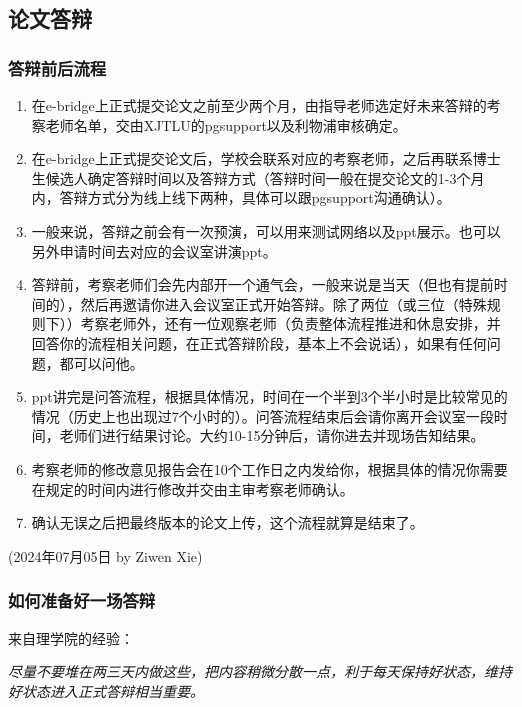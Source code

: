 \subsection{论文答辩}

\subsubsection{答辩前后流程}

\begin{enumerate}
    \item 在e-bridge上正式提交论文之前至少两个月，由指导老师选定好未来答辩的考察老师名单，交由XJTLU的pgsupport以及利物浦审核确定。
    \item 在e-bridge上正式提交论文后，学校会联系对应的考察老师，之后再联系博士生候选人确定答辩时间以及答辩方式（答辩时间一般在提交论文的1-3个月内，答辩方式分为线上线下两种，具体可以跟pgsupport沟通确认）。
    \item 一般来说，答辩之前会有一次预演，可以用来测试网络以及ppt展示。也可以另外申请时间去对应的会议室讲演ppt。
    \item 答辩前，考察老师们会先内部开一个通气会，一般来说是当天（但也有提前时间的），然后再邀请你进入会议室正式开始答辩。除了两位（或三位（特殊规则下））考察老师外，还有一位观察老师（负责整体流程推进和休息安排，并回答你的流程相关问题，在正式答辩阶段，基本上不会说话），如果有任何问题，都可以问他。
    \item ppt讲完是问答流程，根据具体情况，时间在一个半到3个半小时是比较常见的情况（历史上也出现过7个小时的）。问答流程结束后会请你离开会议室一段时间，老师们进行结果讨论。大约10-15分钟后，请你进去并现场告知结果。
    \item 考察老师的修改意见报告会在10个工作日之内发给你，根据具体的情况你需要在规定的时间内进行修改并交由主审考察老师确认。
    \item 确认无误之后把最终版本的论文上传，这个流程就算是结束了。
\end{enumerate}

\begin{flushright}
    (2024年07月05日 by Ziwen Xie)
\end{flushright}


\subsubsection{如何准备好一场答辩}

来自理学院的经验：

\textit{尽量不要堆在两三天内做这些，把内容稍微分散一点，利于每天保持好状态，维持好状态进入正式答辩相当重要。}

